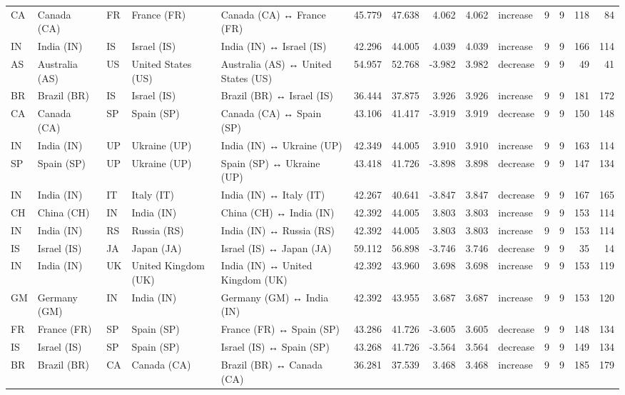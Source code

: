 \begin{tabular}{lllllrrrrlrrrr}
CA & Canada (CA) & FR & France (FR) & Canada (CA) ↔ France (FR) & 45.779 & 47.638 & 4.062 & 4.062 & increase & 9 & 9 & 118 & 84 \\
IN & India (IN) & IS & Israel (IS) & India (IN) ↔ Israel (IS) & 42.296 & 44.005 & 4.039 & 4.039 & increase & 9 & 9 & 166 & 114 \\
AS & Australia (AS) & US & United States (US) & Australia (AS) ↔ United States (US) & 54.957 & 52.768 & -3.982 & 3.982 & decrease & 9 & 9 & 49 & 41 \\
BR & Brazil (BR) & IS & Israel (IS) & Brazil (BR) ↔ Israel (IS) & 36.444 & 37.875 & 3.926 & 3.926 & increase & 9 & 9 & 181 & 172 \\
CA & Canada (CA) & SP & Spain (SP) & Canada (CA) ↔ Spain (SP) & 43.106 & 41.417 & -3.919 & 3.919 & decrease & 9 & 9 & 150 & 148 \\
IN & India (IN) & UP & Ukraine (UP) & India (IN) ↔ Ukraine (UP) & 42.349 & 44.005 & 3.910 & 3.910 & increase & 9 & 9 & 163 & 114 \\
SP & Spain (SP) & UP & Ukraine (UP) & Spain (SP) ↔ Ukraine (UP) & 43.418 & 41.726 & -3.898 & 3.898 & decrease & 9 & 9 & 147 & 134 \\
IN & India (IN) & IT & Italy (IT) & India (IN) ↔ Italy (IT) & 42.267 & 40.641 & -3.847 & 3.847 & decrease & 9 & 9 & 167 & 165 \\
CH & China (CH) & IN & India (IN) & China (CH) ↔ India (IN) & 42.392 & 44.005 & 3.803 & 3.803 & increase & 9 & 9 & 153 & 114 \\
IN & India (IN) & RS & Russia (RS) & India (IN) ↔ Russia (RS) & 42.392 & 44.005 & 3.803 & 3.803 & increase & 9 & 9 & 153 & 114 \\
IS & Israel (IS) & JA & Japan (JA) & Israel (IS) ↔ Japan (JA) & 59.112 & 56.898 & -3.746 & 3.746 & decrease & 9 & 9 & 35 & 14 \\
IN & India (IN) & UK & United Kingdom (UK) & India (IN) ↔ United Kingdom (UK) & 42.392 & 43.960 & 3.698 & 3.698 & increase & 9 & 9 & 153 & 119 \\
GM & Germany (GM) & IN & India (IN) & Germany (GM) ↔ India (IN) & 42.392 & 43.955 & 3.687 & 3.687 & increase & 9 & 9 & 153 & 120 \\
FR & France (FR) & SP & Spain (SP) & France (FR) ↔ Spain (SP) & 43.286 & 41.726 & -3.605 & 3.605 & decrease & 9 & 9 & 148 & 134 \\
IS & Israel (IS) & SP & Spain (SP) & Israel (IS) ↔ Spain (SP) & 43.268 & 41.726 & -3.564 & 3.564 & decrease & 9 & 9 & 149 & 134 \\
BR & Brazil (BR) & CA & Canada (CA) & Brazil (BR) ↔ Canada (CA) & 36.281 & 37.539 & 3.468 & 3.468 & increase & 9 & 9 & 185 & 179 \\

\end{tabular}

